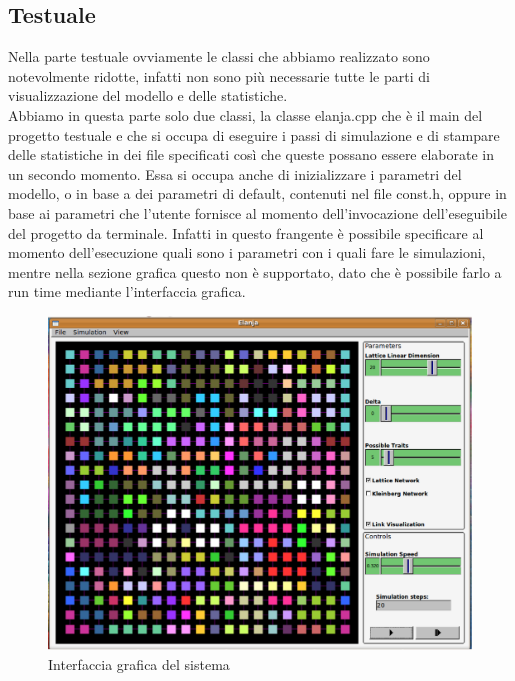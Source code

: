 \documentclass[a4paper,12pt]{article}
\begin{document}
\subsection{Testuale}
Nella parte testuale ovviamente le classi che abbiamo realizzato sono notevolmente ridotte, infatti non sono pi\`u necessarie tutte le parti
di visualizzazione del modello e delle statistiche.\\
Abbiamo in questa parte solo due classi, la classe elanja.cpp che \`e il main del progetto testuale e che si occupa di eseguire i passi di 
simulazione e di stampare delle statistiche in dei file specificati cos\`i che queste possano essere elaborate in un secondo momento. Essa si 
occupa anche di inizializzare i parametri del modello, o in base a dei parametri di default, contenuti nel file const.h, oppure in base ai
parametri che l'utente fornisce al momento dell'invocazione dell'eseguibile del progetto da terminale. Infatti in questo frangente \`e 
possibile specificare al momento dell'esecuzione quali sono i parametri con i quali fare le simulazioni, mentre nella sezione grafica questo 
non \`e supportato, dato che \`e possibile farlo a run time mediante l'interfaccia grafica.

\begin{figure}[!ht]
\begin{center}
\includegraphics[width=\textwidth]{elanja.eps}
\end{center}
\caption{Interfaccia grafica del sistema}
\end{figure}
\end{document}
